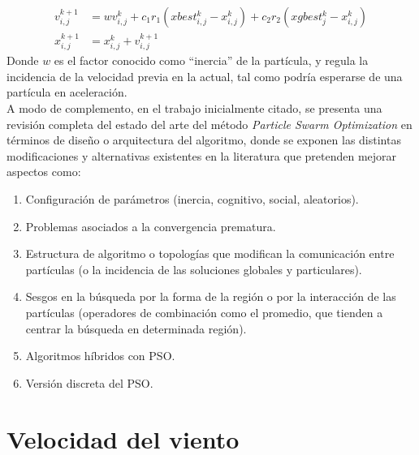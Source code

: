\begin{align}\label{eq:PSO}
    v_{i,j}^{k+1} &= wv_{i,j}^{k} + c_{1}r_{1}(xbest_{i,j}^k - x_{i,j}^k) + c_{2}r_{2}(xgbest_{j}^{k} - x_{i,j}^k)\\
    x_{i,j}^{k+1} &= x_{i,j}^{k} + v_{i,j}^{k+1}
\end{align}    
Donde $w$ es el factor conocido como ``inercia'' de la partícula, y regula la incidencia de la velocidad previa en la actual, tal como podría esperarse de una partícula en aceleración.\\
A modo de complemento, en el trabajo inicialmente citado, se presenta una revisión completa del estado del arte del método \emph{Particle Swarm Optimization} en términos de diseño o arquitectura del algoritmo, donde se exponen las distintas modificaciones y alternativas existentes en la literatura que pretenden mejorar aspectos como:
\begin{enumerate}
    \item  Configuración de parámetros (inercia, cognitivo, social, aleatorios).
    \item  Problemas asociados a la convergencia prematura.
    \item  Estructura de algoritmo o topologías que modifican la comunicación entre partículas (o la incidencia de las soluciones globales y particulares).
    \item  Sesgos en la búsqueda por la forma de la región o por la interacción de las partículas (operadores de combinación como el promedio, que tienden a centrar la búsqueda en determinada región).
    \item  Algoritmos híbridos con PSO.
    \item  Versión discreta del PSO. 
\end{enumerate}  

\section{Velocidad del viento}

